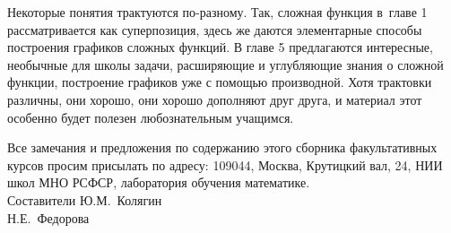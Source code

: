 Некоторые понятия трактуются по-разному. Так, сложная функция в~главе 1
рассматривается как суперпозиция, здесь же даются элементарные способы построения
графиков сложных функций. В главе 5 предлагаются интересные,
необычные для школы задачи, расширяющие и углубляющие знания о сложной функции,
построение графиков уже с помощью производной. Хотя трактовки различны,
они хорошо, они хорошо дополняют друг друга, и материал этот особенно
будет полезен любознательным учащимся.

Все замечания и предложения по содержанию этого сборника факультативных курсов
просим присылать по адресу: 109044, Москва, Крутицкий вал, 24, НИИ школ МНО РСФСР,
лаборатория обучения математике.\\
\noindent
Составители \hfill Ю.М.~Колягин \\
\phantom{Составители} \hfill Н.Е.~Федорова%
